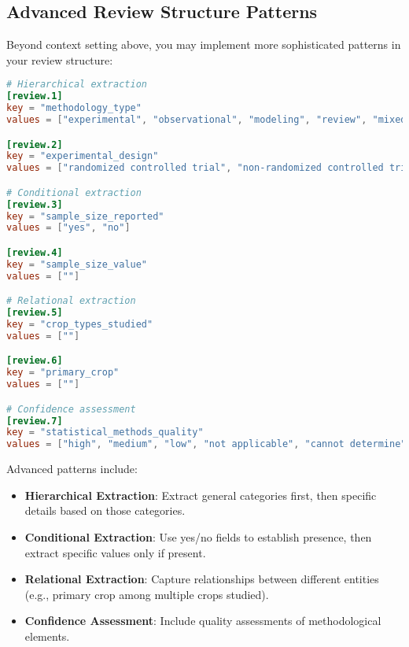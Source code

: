 \subsection{Advanced Review Structure Patterns}

Beyond context setting above, you may implement more sophisticated patterns in your review structure:

\begin{configbox}
\begin{lstlisting}[language=TOML]
# Hierarchical extraction
[review.1]
key = "methodology_type"
values = ["experimental", "observational", "modeling", "review", "mixed", "other", ""]

[review.2]
key = "experimental_design"
values = ["randomized controlled trial", "non-randomized controlled trial", "before-after", "other", "not applicable", ""]

# Conditional extraction
[review.3]
key = "sample_size_reported"
values = ["yes", "no"]

[review.4]
key = "sample_size_value"
values = [""]

# Relational extraction
[review.5]
key = "crop_types_studied"
values = [""]

[review.6]
key = "primary_crop"
values = [""]

# Confidence assessment
[review.7]
key = "statistical_methods_quality"
values = ["high", "medium", "low", "not applicable", "cannot determine", ""]

\end{lstlisting}
\end{configbox}

Advanced patterns include:

\begin{itemize}
    \item \textbf{Hierarchical Extraction}: Extract general categories first, then specific details based on those categories.
    \item \textbf{Conditional Extraction}: Use yes/no fields to establish presence, then extract specific values only if present.
    \item \textbf{Relational Extraction}: Capture relationships between different entities (e.g., primary crop among multiple crops studied).
    \item \textbf{Confidence Assessment}: Include quality assessments of methodological elements.
\end{itemize}


